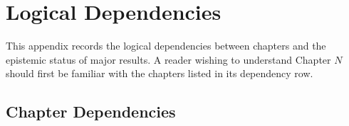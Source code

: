 
\chapter*{Logical Dependencies}

This appendix records the logical dependencies between chapters
and the epistemic status of major results.
A reader wishing to understand Chapter $N$ should first be
familiar with the chapters listed in its dependency row.

\section*{Chapter Dependencies}


